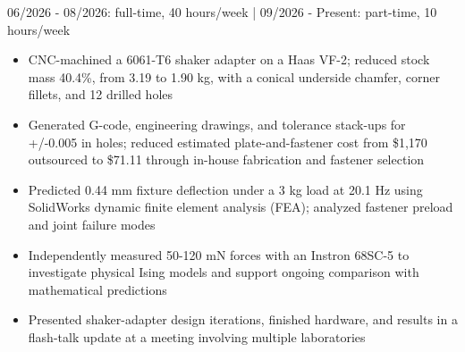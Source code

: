 \documentclass[letterpaper,10pt]{article}
\begin{document}
06/2026 - 08/2026: full-time, 40 hours/week | 09/2026 - Present: part-time, 10 hours/week
\begin{itemize}[leftmargin=12pt,itemsep=2pt,topsep=2pt,parsep=0pt]
\item CNC-machined a 6061-T6 shaker adapter on a Haas VF-2; reduced stock mass 40.4\%, from 3.19 to 1.90 kg, with a conical underside chamfer, corner fillets, and 12 drilled holes
\item Generated G-code, engineering drawings, and tolerance stack-ups for +/-0.005 in holes; reduced estimated plate-and-fastener cost from \$1,170 outsourced to \$71.11 through in-house fabrication and fastener selection
\item Predicted 0.44 mm fixture deflection under a 3 kg load at 20.1 Hz using SolidWorks dynamic finite element analysis (FEA); analyzed fastener preload and joint failure modes
\item Independently measured 50-120 mN forces with an Instron 68SC-5 to investigate physical Ising models and support ongoing comparison with mathematical predictions
\item Presented shaker-adapter design iterations, finished hardware, and results in a flash-talk update at a meeting involving multiple laboratories
\end{itemize}
\newpage
\end{document}
